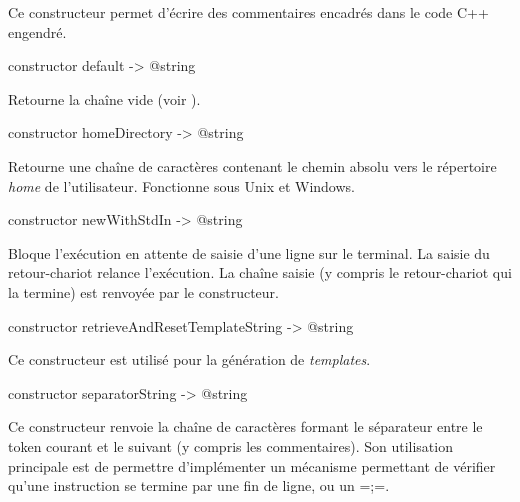 Ce constructeur permet d'écrire des commentaires encadrés dans le code C++ engendré.



\begin{galgasbox}
constructor default -> @string
\end{galgasbox}

Retourne la chaîne vide (voir ).





\begin{galgasbox}
constructor homeDirectory -> @string
\end{galgasbox}

Retourne une chaîne de caractères contenant le chemin absolu vers le répertoire \emph{home} de l'utilisateur. Fonctionne sous Unix et Windows.





\begin{galgasbox}
constructor newWithStdIn -> @string
\end{galgasbox}

Bloque l'exécution en attente de saisie d'une ligne sur le terminal. La saisie du retour-chariot relance l'exécution. La chaîne saisie (y compris le retour-chariot qui la termine) est renvoyée par le constructeur.







\begin{galgasbox}
constructor retrieveAndResetTemplateString -> @string
\end{galgasbox}

Ce constructeur est utilisé pour la génération de \emph{templates}.







\begin{galgasbox}
constructor separatorString -> @string
\end{galgasbox}

Ce constructeur renvoie la chaîne de caractères formant le séparateur entre le token courant et le suivant (y compris les commentaires). Son utilisation principale est de permettre d'implémenter un mécanisme permettant de vérifier qu'une instruction se termine par une fin de ligne, ou un \ggs=;=.

